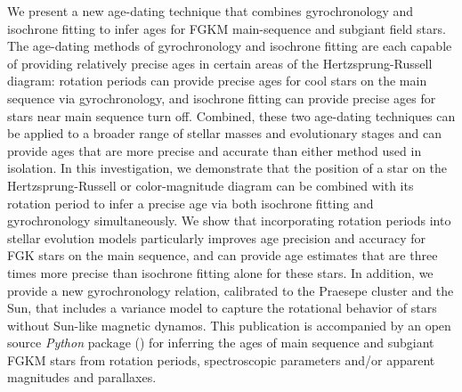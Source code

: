 We present a new age-dating technique that combines gyrochronology and
isochrone fitting to infer ages for FGKM main-sequence and subgiant field
stars.
The age-dating methods of gyrochronology and isochrone fitting are each
capable of providing relatively precise ages in certain areas of the
Hertzsprung-Russell diagram: rotation periods can provide precise ages for
cool stars on the main sequence via gyrochronology, and isochrone fitting
can provide precise ages for stars near main sequence turn off.
Combined, these two age-dating techniques can be applied to a broader range of
stellar masses and evolutionary stages and can provide ages that are more
precise and accurate than either method used in isolation.
In this investigation, we demonstrate that the position of a star on the
Hertzsprung-Russell or color-magnitude diagram can be combined with its
rotation period to infer a precise age via both isochrone fitting and
gyrochronology simultaneously.
We show that incorporating rotation periods into stellar evolution models
particularly improves age precision and accuracy for FGK stars on the main
sequence, and can provide age estimates that are three times more precise than
isochrone fitting alone for these stars.
In addition, we provide a new gyrochronology relation, calibrated to the
Praesepe cluster and the Sun, that includes a variance model to capture the
rotational behavior of stars without Sun-like magnetic dynamos.
This publication is accompanied by an open source {\it Python} package (\sd)
for inferring the ages of main sequence and subgiant FGKM stars from rotation
periods, spectroscopic parameters and/or apparent magnitudes and parallaxes.
